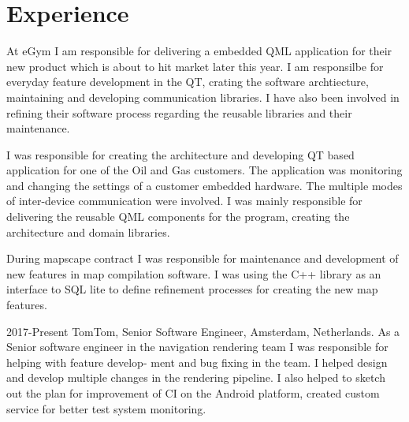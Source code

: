 \documentclass[8pt,a4paper]{moderncv}
\begin{document}
\section{Experience}

\vspace{4mm}
At eGym I am responsible for delivering a embedded QML application for their new product which is about to hit market later this year.
I am responsilbe for everyday feature development in the QT, crating the software archtiecture, maintaining and developing communication libraries.
I have also been involved in refining their software process regarding the reusable libraries and their maintenance.
\cvline{}{}

\vspace{4mm}
I was responsible for creating the architecture and developing QT based application for one of the Oil and Gas customers.
The application was monitoring and changing the settings of a customer embedded hardware.
The multiple modes of inter-device communication were involved.
I was mainly responsible for delivering the reusable QML components for the program, creating the architecture and domain libraries.
\cvline{}{}

\vspace{4mm}
During mapscape contract I was responsible for maintenance and development of new features in map compilation software. I was using the C++ library as an interface to SQL lite to define refinement processes for creating the new map features.
\cvline{}{}

\vspace{4mm}
2017-Present TomTom,
Senior Software Engineer, Amsterdam, Netherlands.
As a Senior software engineer in the navigation rendering team I was responsible for helping with feature develop-
ment and bug fixing in the team. I helped design and develop multiple changes in the rendering pipeline. I also helped to sketch out the plan for improvement of CI on the Android platform, created custom service for better test
system monitoring.
\cvline{}{}
\end{document}
